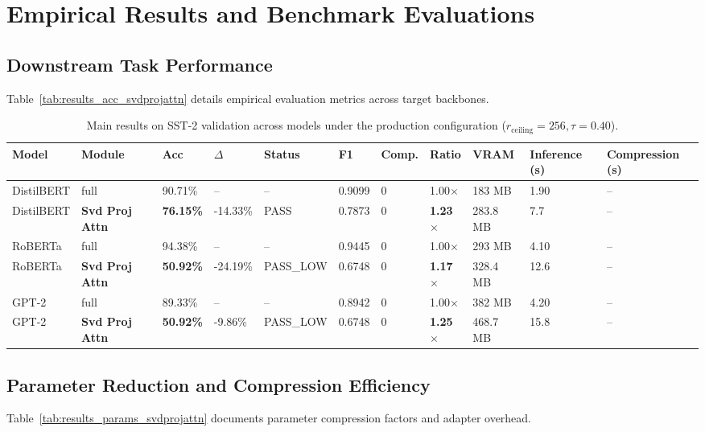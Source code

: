 \section{Empirical Results and Benchmark Evaluations}

\subsection{Downstream Task Performance}
Table~\ref{tab:results_acc_svdprojattn} details empirical evaluation metrics across target backbones.

\begin{table}[t]
\centering
\small
\begin{tabular}{lllllllllll}
\toprule
\textbf{Model} & \textbf{Module} & \textbf{Acc} & \textbf{$\Delta$} & \textbf{Status} & \textbf{F1} & \textbf{Comp.} & \textbf{Ratio} & \textbf{VRAM} & \textbf{Inference (s)} & \textbf{Compression (s)} \\
\midrule
DistilBERT & full & 90.71\% & -- & -- & 0.9099 & 0 & 1.00$\times$ & 183 MB & 1.90 & -- \\
DistilBERT & \textbf{Svd Proj Attn} & \textbf{76.15\%} & -14.33\% & PASS & 0.7873 & 0 & \textbf{1.23$\times$} & 283.8 MB & 7.7 & -- \\
RoBERTa & full & 94.38\% & -- & -- & 0.9445 & 0 & 1.00$\times$ & 293 MB & 4.10 & -- \\
RoBERTa & \textbf{Svd Proj Attn} & \textbf{50.92\%} & -24.19\% & PASS_LOW & 0.6748 & 0 & \textbf{1.17$\times$} & 328.4 MB & 12.6 & -- \\
GPT-2 & full & 89.33\% & -- & -- & 0.8942 & 0 & 1.00$\times$ & 382 MB & 4.20 & -- \\
GPT-2 & \textbf{Svd Proj Attn} & \textbf{50.92\%} & -9.86\% & PASS_LOW & 0.6748 & 0 & \textbf{1.25$\times$} & 468.7 MB & 15.8 & -- \\
\bottomrule
\end{tabular}
\caption{Main results on SST-2 validation across models under the production configuration ($r_{\mathrm{ceiling}}=256, \tau=0.40$).}
\label{tab:main_sst2}
\end{table}

\subsection{Parameter Reduction and Compression Efficiency}
Table~\ref{tab:results_params_svdprojattn} documents parameter compression factors and adapter overhead.

